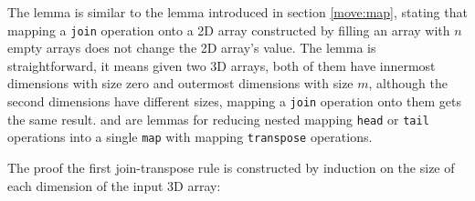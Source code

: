 \documentclass{l4proj}
\begin{document}
The lemma  is similar to the lemma  introduced in section \ref{move:map}, stating that mapping a \texttt{join} operation onto a 2D array constructed by filling an array with $n$ empty arrays does not change the 2D array's value. The lemma  is straightforward, it means given two 3D arrays, both of them have innermost dimensions with size zero and outermost dimensions with size $m$, although the second dimensions have different sizes, mapping a \texttt{join} operation onto them gets the same result.  and  are lemmas for reducing nested mapping \texttt{head} or \texttt{tail} operations into a single \texttt{map} with mapping \texttt{transpose} operations.

The proof the first join-transpose rule is constructed by induction on the size of each dimension of the input 3D array:
\end{document}
